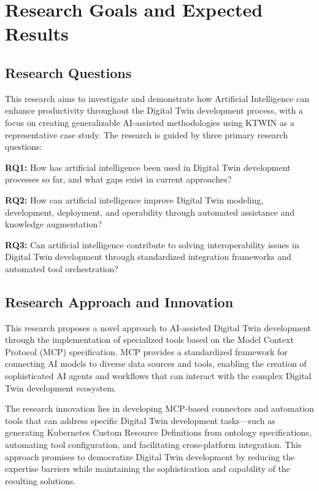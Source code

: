 
\chapter{Research Goals and Expected Results}

\section{Research Questions}

This research aims to investigate and demonstrate how Artificial Intelligence can enhance productivity throughout the Digital Twin development process, with a focus on creating generalizable AI-assisted methodologies using KTWIN as a representative case study. The research is guided by three primary research questions:

\textbf{RQ1:} How has artificial intelligence been used in Digital Twin development processes so far, and what gaps exist in current approaches?

\textbf{RQ2:} How can artificial intelligence improve Digital Twin modeling, development, deployment, and operability through automated assistance and knowledge augmentation?

\textbf{RQ3:} Can artificial intelligence contribute to solving interoperability issues in Digital Twin development through standardized integration frameworks and automated tool orchestration?

\section{Research Approach and Innovation}

This research proposes a novel approach to AI-assisted Digital Twin development through the implementation of specialized tools based on the Model Context Protocol (MCP) specification. MCP provides a standardized framework for connecting AI models to diverse data sources and tools, enabling the creation of sophisticated AI agents and workflows that can interact with the complex Digital Twin development ecosystem.

The research innovation lies in developing MCP-based connectors and automation tools that can address specific Digital Twin development tasks—such as generating Kubernetes Custom Resource Definitions from ontology specifications, automating tool configuration, and facilitating cross-platform integration. This approach promises to democratize Digital Twin development by reducing the expertise barriers while maintaining the sophistication and capability of the resulting solutions.

